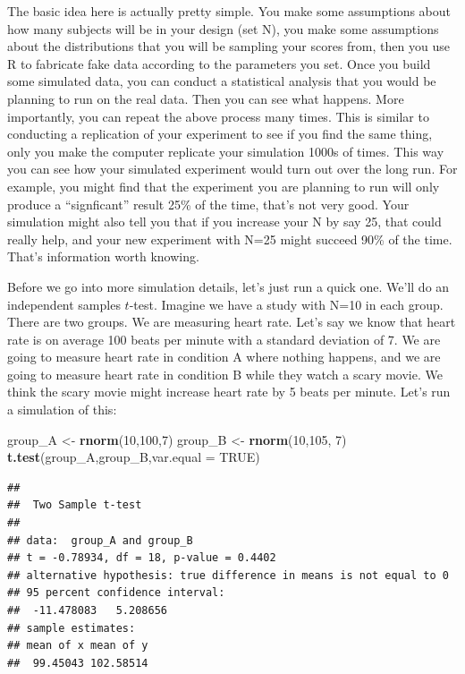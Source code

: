 \documentclass[
]{book}
\newenvironment{Shaded}{\begin{snugshade}}{\end{snugshade}}
\newcommand{\AttributeTok}[1]{\textcolor[rgb]{0.13,0.29,0.53}{#1}}
\newcommand{\ConstantTok}[1]{\textcolor[rgb]{0.56,0.35,0.01}{#1}}
\newcommand{\DecValTok}[1]{\textcolor[rgb]{0.00,0.00,0.81}{#1}}
\newcommand{\FunctionTok}[1]{\textcolor[rgb]{0.13,0.29,0.53}{\textbf{#1}}}
\newcommand{\NormalTok}[1]{#1}
\newcommand{\OtherTok}[1]{\textcolor[rgb]{0.56,0.35,0.01}{#1}}
\begin{document}
The basic idea here is actually pretty simple. You make some assumptions about how many subjects will be in your design (set N), you make some assumptions about the distributions that you will be sampling your scores from, then you use R to fabricate fake data according to the parameters you set. Once you build some simulated data, you can conduct a statistical analysis that you would be planning to run on the real data. Then you can see what happens. More importantly, you can repeat the above process many times. This is similar to conducting a replication of your experiment to see if you find the same thing, only you make the computer replicate your simulation 1000s of times. This way you can see how your simulated experiment would turn out over the long run. For example, you might find that the experiment you are planning to run will only produce a ``signficant'' result 25\% of the time, that's not very good. Your simulation might also tell you that if you increase your N by say 25, that could really help, and your new experiment with N=25 might succeed 90\% of the time. That's information worth knowing.

Before we go into more simulation details, let's just run a quick one. We'll do an independent samples \(t\)-test. Imagine we have a study with N=10 in each group. There are two groups. We are measuring heart rate. Let's say we know that heart rate is on average 100 beats per minute with a standard deviation of 7. We are going to measure heart rate in condition A where nothing happens, and we are going to measure heart rate in condition B while they watch a scary movie. We think the scary movie might increase heart rate by 5 beats per minute. Let's run a simulation of this:

\begin{Shaded}
\begin{Highlighting}[]
\NormalTok{group\_A }\OtherTok{\textless{}{-}} \FunctionTok{rnorm}\NormalTok{(}\DecValTok{10}\NormalTok{,}\DecValTok{100}\NormalTok{,}\DecValTok{7}\NormalTok{)}
\NormalTok{group\_B }\OtherTok{\textless{}{-}} \FunctionTok{rnorm}\NormalTok{(}\DecValTok{10}\NormalTok{,}\DecValTok{105}\NormalTok{, }\DecValTok{7}\NormalTok{)}
\FunctionTok{t.test}\NormalTok{(group\_A,group\_B,}\AttributeTok{var.equal =} \ConstantTok{TRUE}\NormalTok{)}
\end{Highlighting}
\end{Shaded}

\begin{verbatim}
## 
##  Two Sample t-test
## 
## data:  group_A and group_B
## t = -0.78934, df = 18, p-value = 0.4402
## alternative hypothesis: true difference in means is not equal to 0
## 95 percent confidence interval:
##  -11.478083   5.208656
## sample estimates:
## mean of x mean of y 
##  99.45043 102.58514
\end{verbatim}
\end{document}
